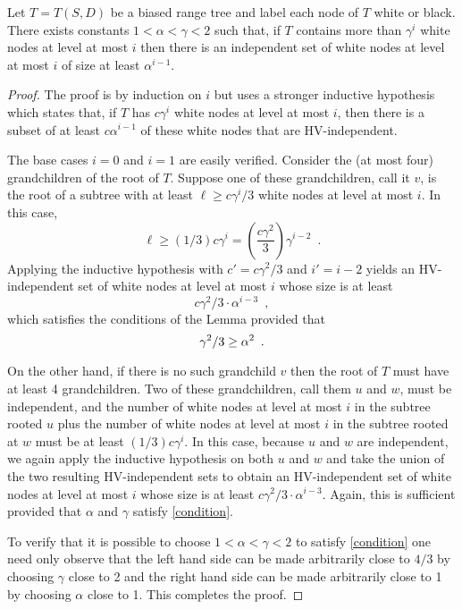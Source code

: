 \documentclass[lotsofwhite,charterfonts]{patmorin}
\begin{document}
\begin{lem}
Let $T=T(S,D)$ be a biased range tree and label each node of $T$ white
or black.
There exists
constants $1 < \alpha < \gamma < 2$ such that, if $T$ contains more
than $\gamma^i$ white nodes at level at most $i$ then there is an
independent set of white nodes at level at most $i$ of size at least
$\alpha^{i-1}$.
\end{lem}

\begin{proof}
The proof is by induction on $i$ but uses a stronger inductive
hypothesis which states that, if $T$ has $c\gamma^i$ white nodes
at level at most $i$, then there is a subset of at least
$c\alpha^{i-1}$ of these white nodes that are HV-independent.  

The base cases $i=0$ and $i=1$ are easily verified.
Consider the (at most four) grandchildren of the root of $T$.
Suppose one of these grandchildren, call it $v$, is the root of a
subtree with at least $\ell \ge c\gamma^i/3$ white nodes at level at
most $i$.
In this case,
\[
    \ell \ge (1/3) c\gamma^i = \left(\frac{c\gamma^2}{3}\right)
		\gamma^{i-2} \enspace .
\]
Applying the inductive hypothesis with $c'=c\gamma^2/3$ and $i'=i-2$
yields an HV-independent set of white nodes at level at most $i$ whose 
size is at least
\[
     c\gamma^2/3\cdot\alpha^{i-3} \enspace ,
\] 
which satisfies the conditions of the Lemma provided that
\begin{equation}
	\gamma^2/3 \ge \alpha^2 \enspace . \eqlabel{condition}
\end{equation}

On the other hand, if there is no such grandchild $v$ then the root of
$T$ must have at least 4 grandchildren.  Two of these grandchildren,
call them $u$ and $w$, must be independent, and the number of white
nodes at level at most $i$ in the subtree rooted $u$ plus the number
of white nodes at level at most $i$ in the subtree rooted at $w$ must
be at least $(1/3) c\gamma^i$.  In this case, because $u$ and $w$ are
independent, we again apply the inductive hypothesis on both $u$ and
$w$ and take the union of the two resulting HV-independent sets to
obtain an HV-independent set of white nodes at level at most $i$ whose
size is at least $c\gamma^2/3\cdot\alpha^{i-3}$.  Again, this is sufficient
provided that $\alpha$ and $\gamma$ satisfy \eqref{condition}.

To verify that it is possible to choose $1 < \alpha <\gamma < 2$ to
satisfy \eqref{condition} one need only observe that the left hand
side can be made arbitrarily close to $4/3$ by choosing $\gamma$ close
to 2 and the right hand side can be made arbitrarily close to 1 by
choosing $\alpha$ close to 1.  This completes the proof.
\end{proof}
\end{document}
